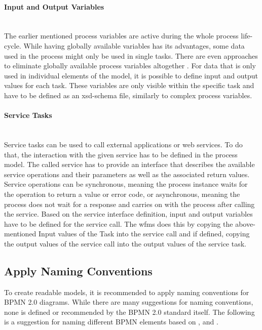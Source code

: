\paragraph{Input and Output Variables}~\\
The earlier mentioned process variables are active during the whole process life-cycle. While having globally available variables has its advantages, some data used in the process might only be used in single tasks. There are even approaches to eliminate globally available process variables altogether \cite{goodbye}. For data that is only used in individual elements of the model, it is possible to define input and output values for each task. These variables are only visible within the specific task and have to be defined as an \gls{xsd}-schema file, similarly to complex process variables. \cite{fundamentals}

\paragraph{Service Tasks}~\\
Service tasks can be used to call external applications or web services. To do that, the interaction with the given service has to be defined in the process model. The called service has to provide an interface that describes the available service operations and their parameters as well as the associated return values. Service operations can be synchronous, meaning the process instance waits for the operation to return a value or error code, or asynchronous, meaning the process does not wait for a response and carries on with the process after calling the service. Based on the service interface definition, input and output variables have to be defined for the service call. The \gls{wfms} does this by copying the above-mentioned Input values of the Task into the service call and if defined, copying the output values of the service call into the output values of the service task. \cite{fundamentals}

\subsection{Apply Naming Conventions}
\label{naming}
To create readable models, it is recommended to apply naming conventions for BPMN 2.0 diagrams. While there are many suggestions for naming conventions, none is defined or recommended by the BPMN 2.0 standard \cite{bpmnstandard} itself. The following is a suggestion for naming different BPMN elements based on  \cite{freund2019real}, \cite{c}   \cite{suarez2010best} and \cite{radulian2020rethinking}. 

